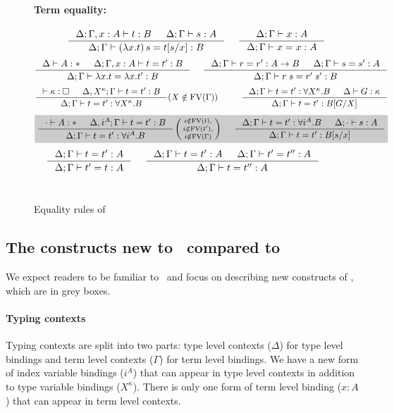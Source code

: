 \begin{figure*}
\paragraph{Term equality:} 
$ \qquad
 ~~~~
   \inference{\Delta;\Gamma,x:A |- t:B & \Delta;\Gamma |- s:A}
             {\Delta;\Gamma |- (\lambda x.t)\,s=t[s/x] : B}
 ~~~~
   \inference{\Delta;\Gamma |- x:A}{\Delta;\Gamma |- x=x:A}
$
\[ \inference{\Delta |- A:* & \Delta;\Gamma,x:A |- t=t':B}
             {\Delta;\Gamma |- \lambda x.t = \lambda x.t':B}
 ~~~~
   \inference{\Delta;\Gamma |- r=r':A-> B & \Delta;\Gamma |- s=s':A}
             {\Delta;\Gamma |- r\;s=r'\;s':B}
\]
\[ \inference{|- \kappa:\square & \Delta, X^\kappa;\Gamma |- t=t' : B}
             {\Delta;\Gamma |- t=t' : \forall X^\kappa.B}
	     (X\notin\FV(\Gamma))
 ~~~~ ~~~~
   \inference{ \Delta;\Gamma |- t=t' : \forall X^\kappa.B
             & \Delta |- G:\kappa }
             {\Delta;\Gamma |- t=t' : B[G/X]}
\]
\[ \newFi{
   \inference{\cdot |- A:* & \Delta, i^A;\Gamma |- t=t' : B}
             {\Delta;\Gamma |- t=t' : \forall i^A.B}
   \left(\begin{smallmatrix}
		i\notin\FV(t),\\
		i\notin\FV(t'),\\
		i\notin\FV(\Gamma)\end{smallmatrix}\right)
 ~~~~
   \inference{ \Delta;\Gamma |- t=t' : \forall i^A.B
             & \Delta;\cdot |- s:A}
             {\Delta;\Gamma |- t=t' : B[s/x]} }
\]
\[ \inference{\Delta;\Gamma |- t=t':A}{\Delta;\Gamma |- t'=t:A}
 ~~~~
   \inference{\Delta;\Gamma |- t=t':A & \Delta;\Gamma |- t'=t'':A}
             {\Delta;\Gamma |- t=t'':A}
\]
~\\
\caption{Equality rules of \Fi}
\label{fig:eqFi}
\end{figure*}

\subsection{The constructs new to \Fi\ compared to \Fw} \label{ssec:newFi}
We expect readers to be familiar to \Fw\
and focus on describing new constructs of \Fi, which are in grey boxes.

\paragraph{Typing contexts}
Typing contexts are split into two parts:
type level contexts ($\Delta$) for type level bindings
and term level contexts ($\Gamma$) for term level bindings.
We have a new form of index variable bindings ($i^A$) that can appear in
type level contexts in addition to type variable bindings ($X^\kappa$).
There is only one form of term level binding ($x:A$) that can appear in
term level contexts.

